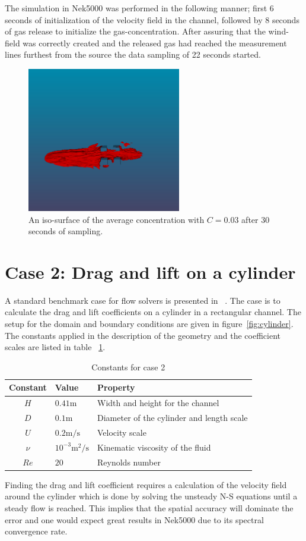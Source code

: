 The simulation in Nek5000 was performed in the following manner; first 6 seconds of initialization of the velocity field in the 
channel, followed by 8 seconds of gas release to initialize the gas-concentration. After assuring that the wind-field was 
correctly created and the released gas had reached the measurement lines furthest from the source the data sampling of 22 seconds 
started.
%
\begin{figure}[h]
	\centering
	\includegraphics[width=0.6\textwidth]{Figures/plume2.png}
	\caption{An iso-surface of the average concentration with $C=0.03$ 
    after 30 seconds of sampling.}
	\label{fig:plume}
\end{figure}
%

\section{Case 2: Drag and lift on a cylinder}
A standard benchmark case for flow solvers is presented in ~\cite{benchmark}. 
The case is to calculate the drag and lift coefficients on a cylinder in a rectangular channel.
The setup for the domain and boundary conditions are given in figure~\ref{fig:cylinder}.
The constants applied in the description of the geometry and the coefficient scales are listed 
in table ~\ref{tab:case2consts}.
%
\begin{table}[h]
    \centering
    \begin{tabular}{c l l}
     Constant & Value & Property \\ \hline
    $H$ & $0.41\text{m}$ & Width and height for the channel \\
    $D$ & $0.1\text{m}$ & Diameter of the cylinder and length scale \\
    $U$ & $0.2\text{m/s}$ & Velocity scale \\
    $\nu$ &  $ 10^{-3}\text{m$^2$/s}$ & Kinematic viscosity of the fluid \\
    $Re$ & $20$ & Reynolds number \\ 
    \end{tabular}
    \caption{Constants for case 2}
    \label{tab:case2consts}
\end{table}
%
Finding the drag and lift coefficient requires a calculation of the velocity field around the cylinder
which is done by solving the unsteady N-S equations until a steady flow is reached. This implies that the
spatial accuracy will dominate the error and one would expect great results in Nek5000 
due to its spectral convergence rate.

